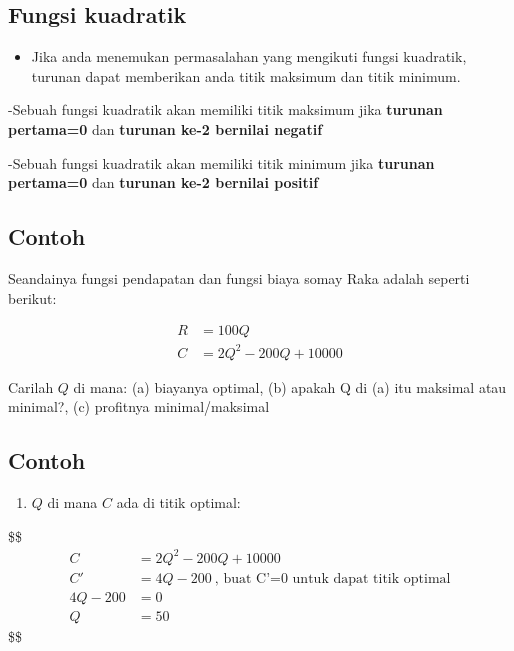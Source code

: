 \documentclass[
  letterpaper,
  DIV=11,
  numbers=noendperiod]{scrartcl}
\providecommand{\tightlist}{%
  \setlength{\itemsep}{0pt}\setlength{\parskip}{0pt}}\usepackage{longtable,booktabs,array}
\begin{document}
\subsection{Fungsi kuadratik}\label{fungsi-kuadratik}

\begin{itemize}
\tightlist
\item
  Jika anda menemukan permasalahan yang mengikuti fungsi kuadratik,
  turunan dapat memberikan anda titik maksimum dan titik minimum.
\end{itemize}

-Sebuah fungsi kuadratik akan memiliki titik maksimum jika
\textbf{turunan pertama=0} dan \textbf{turunan ke-2 bernilai negatif}

-Sebuah fungsi kuadratik akan memiliki titik minimum jika
\textbf{turunan pertama=0} dan \textbf{turunan ke-2 bernilai positif}

\subsection{Contoh}\label{contoh-7}

Seandainya fungsi pendapatan dan fungsi biaya somay Raka adalah seperti
berikut:

\[
\begin{align}
R&=100Q \\
C&=2Q^2-200Q+10000
\end{align}
\]

Carilah \(Q\) di mana: (a) biayanya optimal, (b) apakah Q di (a) itu
maksimal atau minimal?, (c) profitnya minimal/maksimal

\subsection{Contoh}\label{contoh-8}

\begin{enumerate}
\def\labelenumi{\alph{enumi}.}
\tightlist
\item
  \(Q\) di mana \(C\) ada di titik optimal:
\end{enumerate}

\$\$ \begin{align}
C&=2Q^2-200Q+10000 \\
C'&=4Q-200 \ \text{, buat C'=0 untuk dapat titik optimal} \\
4Q-200&=0\\
Q&=50

\end{align} \$\$
\end{document}
